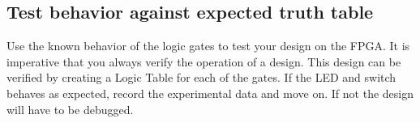       \subsection{Test behavior against expected truth table} 
      Use the known behavior of the logic gates to test your design on the FPGA. It is imperative that you always verify the operation of a design. This design can be verified by creating a Logic Table for each of the gates. If the LED and switch behaves as expected, record the experimental data and move on. If not the design will have to be debugged.


